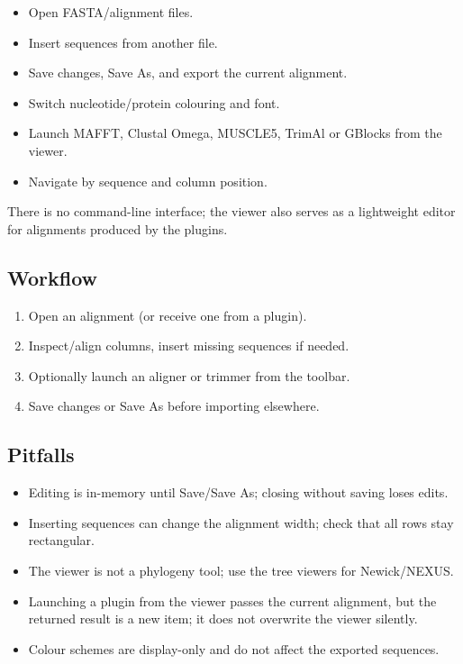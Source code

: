 \documentclass[11pt]{report}
\begin{document}
\begin{itemize}
  \item Open FASTA/alignment files.
  \item Insert sequences from another file.
  \item Save changes, Save As, and export the current alignment.
  \item Switch nucleotide/protein colouring and font.
  \item Launch MAFFT, Clustal Omega, MUSCLE5, TrimAl or GBlocks from the viewer.
  \item Navigate by sequence and column position.
\end{itemize}

There is no command-line interface; the viewer also serves as a lightweight editor for alignments produced by the plugins.

\subsection{Workflow}

\begin{enumerate}
  \item Open an alignment (or receive one from a plugin).
  \item Inspect/align columns, insert missing sequences if needed.
  \item Optionally launch an aligner or trimmer from the toolbar.
  \item Save changes or Save As before importing elsewhere.
\end{enumerate}

\subsection{Pitfalls}

\begin{itemize}
  \item Editing is in-memory until Save/Save As; closing without saving loses edits.
  \item Inserting sequences can change the alignment width; check that all rows stay rectangular.
  \item The viewer is not a phylogeny tool; use the tree viewers for Newick/NEXUS.
  \item Launching a plugin from the viewer passes the current alignment, but the returned result is a new item; it does not overwrite the viewer silently.
  \item Colour schemes are display-only and do not affect the exported sequences.
\end{itemize}
\end{document}
